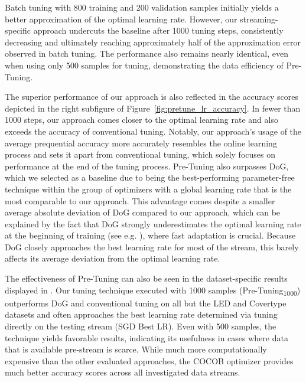 \documentclass{article} %
\begin{document}
Batch tuning with 800 training and 200 validation samples initially yields a better approximation of the optimal learning rate. However, our streaming-specific approach undercuts the baseline after 1000 tuning steps, consistently decreasing and ultimately reaching approximately half of the approximation error observed in batch tuning.
The performance also remains nearly identical, even when using only 500 samples for tuning, demonstrating the data efficiency of Pre-Tuning.

The superior performance of our approach is also reflected in the accuracy scores depicted in the right subfigure of Figure~\ref{fig:pretune_lr_accuracy}.
In fewer than 1000 steps, our approach comes closer to the optimal learning rate and also exceeds the accuracy of conventional tuning.
Notably, our approach's usage of the average prequential accuracy more accurately resembles the online learning process and sets it apart from conventional tuning, which solely focuses on performance at the end of the tuning process.
Pre-Tuning also surpasses DoG, which we selected as a baseline due to being the best-performing parameter-free technique within the group of optimizers with a global learning rate that is the most comparable to our approach.
This advantage comes despite a smaller average absolute deviation of DoG compared to our approach, which can be explained by the fact that DoG strongly underestimates the optimal learning rate at the beginning of training (see e.g. ), where fast adaptation is crucial.
Because DoG closely approaches the best learning rate for most of the stream, this barely affects its average deviation from the optimal learning rate.

The effectiveness of Pre-Tuning can also be seen in the dataset-specific results displayed in .
Our tuning technique executed with 1000 samples (Pre-Tuning\textsubscript{1000}) outperforms DoG and conventional tuning on all but the LED and Covertype datasets and often approaches the best learning rate determined via tuning directly on the testing stream (SGD Best LR).
Even with 500 samples, the technique yields favorable results, indicating its usefulness in cases where data that is available pre-stream is scarce.
While much more computationally expensive than the other evaluated approaches, the COCOB optimizer provides much better accuracy scores across all investigated data streams.
\end{document}
